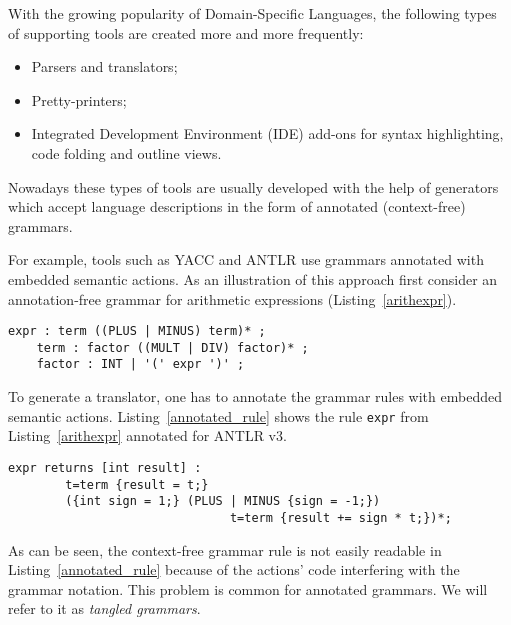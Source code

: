\documentclass{IOS-Book-Article}     %
\newcommand{\bad}[1]{\textcolor{red}{#1}}
\renewcommand{\bad}[1]{#1}
\newcommand{\lstref}[1]{Listing~\ref{#1}}
\newcommand{\tool}[1]{\textsc{#1}}
\begin{document}
With the growing popularity of Domain-Specific Languages, the following types of supporting tools are created \bad{more and} more frequently:
\begin{itemize}
	\item Parsers and translators;
	\item Pretty-printers;
	\item Integrated Development Environment (IDE) add-ons for syntax highlighting, code folding and outline views.
\end{itemize}

Nowadays these types of tools are usually developed with the help of generators which accept language descriptions in the form of annotated (context-free) grammars. 

For example, tools such as \tool{YACC} \cite{YACC} and \tool{ANTLR} \cite{ANTLR} use grammars annotated with embedded semantic actions. As an illustration of this approach first consider an annotation-free grammar for arithmetic expressions (\lstref{arithexpr}).
\begin{lstlisting}[language=Grammatic,label=arithexpr,caption=Grammar for arithmetic expressions,float]
    expr : term ((PLUS | MINUS) term)* ;
    term : factor ((MULT | DIV) factor)* ;
    factor : INT | '(' expr ')' ;
\end{lstlisting}
To generate a translator, one has to annotate the grammar rules with embedded semantic actions. \lstref{annotated_rule} shows the rule \texttt{expr} from \lstref{arithexpr} annotated for \tool{ANTLR} v3.
\begin{lstlisting}[caption=Annotated grammar rule,label=annotated_rule,float]
    expr returns [int result] : 
        t=term {result = t;} 
        ({int sign = 1;} (PLUS | MINUS {sign = -1;}) 
                               t=term {result += sign * t;})*;
\end{lstlisting}

As can be seen, the context-free grammar rule is not easily readable in \lstref{annotated_rule} because of the actions' code interfering with the grammar notation. This problem is common for annotated grammars. We will refer to it as \emph{tangled grammars}.
\end{document}
